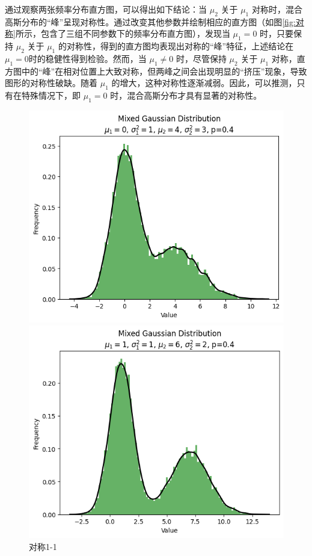 \documentclass{article}
\begin{document}
通过观察两张频率分布直方图，可以得出如下结论：当 $\mu_2$ 关于 $\mu_1$ 对称时，混合高斯分布的“峰”呈现对称性。通过改变其他参数并绘制相应的直方图（如图\ref{fig:对称}所示，包含了三组不同参数下的频率分布直方图），发现当 $\mu_1 = 0$ 时，只要保持 $\mu_2$ 关于 $\mu_1$ 的对称性，得到的直方图均表现出对称的“峰”特征，上述结论在$\mu_1 = 0$时的稳健性得到检验。然而，当 $\mu_1 \neq 0$ 时，尽管保持 $\mu_2$ 关于 $\mu_1$ 对称，直方图中的“峰”在相对位置上大致对称，但两峰之间会出现明显的“挤压”现象，导致图形的对称性破缺。随着 $\mu_1$ 的增大，这种对称性逐渐减弱。因此，可以推测，只有在特殊情况下，即 $\mu_1 = 0$ 时，混合高斯分布才具有显著的对称性。\label{sec:symmetry}

\begin{figure}[H]
    \centering
    \begin{minipage}[b]{0.3\linewidth}
        \centering
        \includegraphics[width=\linewidth]{figure/对称1.png}
        \caption{对称1-1}
    \end{minipage}
    \hfill
    \begin{minipage}[b]{0.3\linewidth}
        \centering
        \includegraphics[width=\linewidth]{figure/对称3.png}

\end{minipage}
\end{figure}
\end{document}
